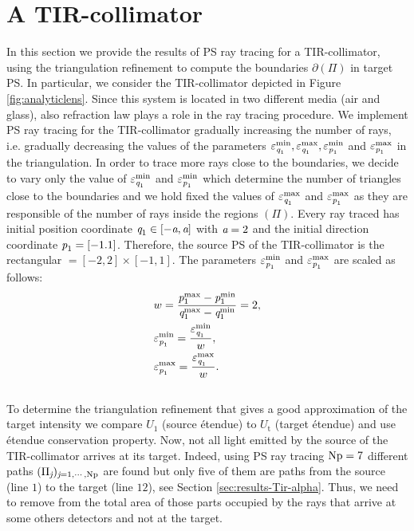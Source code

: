 \section{A TIR-collimator}
In this section we provide the results of PS ray tracing for a TIR-collimator, using the triangulation refinement to compute the boundaries $\partial$$(\Pi)$ in target PS. In particular, we consider the TIR-collimator depicted in Figure \ref{fig:analyticlens}. Since this system is located in two different media (air and glass), also refraction law plays a role in the ray tracing procedure. We implement PS ray tracing for the TIR-collimator gradually increasing the number of rays, i.e. gradually decreasing the values of the parameters $\varepsilon_{\textit{q}_1}^{\textrm{min}}, \varepsilon_{\textit{q}_1}^{\textrm{max}}, \varepsilon_{\textit{p}_1}^{\textrm{min}}$ and $\varepsilon_{\textit{p}_1}^{\textrm{max}}$ in the triangulation. In order to trace more rays close to the boundaries, we decide to vary only the value of $\varepsilon_{\textit{q}_1}^{\textrm{min}}$ and $ \varepsilon_{\textit{p}_1}^{\textrm{min}}$ which determine the number of triangles close to the boundaries and we hold fixed the values of $ \varepsilon_{\textit{q}_1}^{\textrm{max}}$ and $ \varepsilon_{\textit{p}_1}^{\textrm{max}}$ as they are responsible of the number of rays inside the regions $(\Pi)$. Every ray traced has initial position coordinate $\textit{q}_1\in[-\textit{a}, \textit{a}]$ with $\textit{a}=2$ and the initial direction coordinate $\textit{p}_1=[-1.1]$. Therefore, the source PS of the TIR-collimator is the rectangular $= [-2, 2] \times [-1, 1]$. The parameters $\varepsilon_{\textit{p}_1}^{\textrm{min}}$ and $\varepsilon_{\textit{p}_1}^{\textrm{max}}$ are scaled as follows:
\begin{equation}\label{eq:scaled_parameters}
\begin{aligned}
& w = \frac{\textit{p}_1^{\textrm{max}}-\textit{p}_1^{\textrm{min}}}{\textit{q}_1^{\textrm{max}}-\textit{q}_1^{\textrm{min}}}=2,\\
&\varepsilon_{\textit{p}_1}^{\textrm{min}}= \frac{\varepsilon_{\textit{q}_1}^{\textrm{min}}}{w}, \\
&\varepsilon_{\textit{p}_1}^{\textrm{max}}= \frac{\varepsilon_{\textit{q}_1}^{\textrm{max}}}{w}.
\end{aligned}
\end{equation}
\\ \indent To determine the triangulation refinement that gives a good approximation of the target intensity we compare $U_1$ (source \'{e}tendue) to $U_{\textrm{t}}$ (target \'{e}tendue) and use \'{e}tendue conservation property. Now, not all light emitted by the source of the TIR-collimator arrives at its target. Indeed, using PS ray tracing $\textrm{Np}=7$ different paths $(\Pi_{\textit{j}})_{\textit{j}=1, \cdots, \textrm{Np}}$ are found but only five of them are paths from the source (line $1$) to the target (line $12$), see Section \ref{sec:results-Tir-alpha}. Thus, we need to remove from the total area of  those parts occupied by the rays that arrive at some others detectors and not at the target. %
